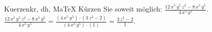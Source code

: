 \begin{MAufgabe}{Kuerzen}{kr, dh, MaTeX}
K\"urzen Sie soweit m\"oglich: $\frac{12\, x^5\, y^5\, z^2 - 8\, x^5\, y^5}{4\, x^5\, y^5}$.\\ 
\ifLsg\MLoesung
\quad $\frac{12\, x^5\, y^5\, z^2 - 8\, x^5\, y^5}{4\, x^5\, y^5}=\frac{(4\, x^5\, y^5)\cdot(3\, z^2 - 2)}{(4\, x^5\, y^5)\cdot(1)}=\frac{3\, z^2 - 2}{1}$.\else\relax\fi
 \end{MAufgabe}